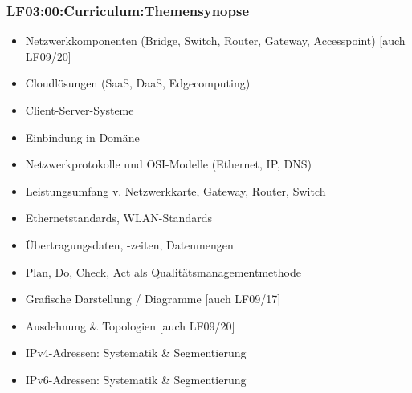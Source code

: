 \begin{frame}
  \frametitle{LF03:00:Curriculum:Themensynopse}
  \begin{footnotesize}
    \begin{itemize}
      \item[\faSquareO] Netzwerkkomponenten (Bridge, Switch, Router, Gateway, Accesspoint) [auch LF09/20]
      \item[\faSquareO] Cloudlösungen (SaaS, DaaS, Edgecomputing) 
      \item[\faSquareO] Client-Server-Systeme 
      \item[\faSquareO] Einbindung in Domäne
      \item[\faSquareO] Netzwerkprotokolle und OSI-Modelle (Ethernet, IP, DNS) 
      \item[\faSquareO] Leistungsumfang v. Netzwerkkarte, Gateway, Router, Switch 
      \item[\faSquareO] Ethernetstandards, WLAN-Standards 
      \item[\faSquareO] Übertragungsdaten, -zeiten, Datenmengen 
      \item[\faSquareO] Plan, Do, Check, Act als Qualitätsmanagementmethode 
      \item[\faSquareO] Grafische Darstellung / Diagramme [auch LF09/17]
      \item[\faSquareO] Ausdehnung \& Topologien [auch LF09/20]
      \item[\faSquareO] IPv4-Adressen: Systematik \& Segmentierung 
      \item[\faSquareO] IPv6-Adressen: Systematik \& Segmentierung 
    \end{itemize}
  \end{footnotesize}
\end{frame}
